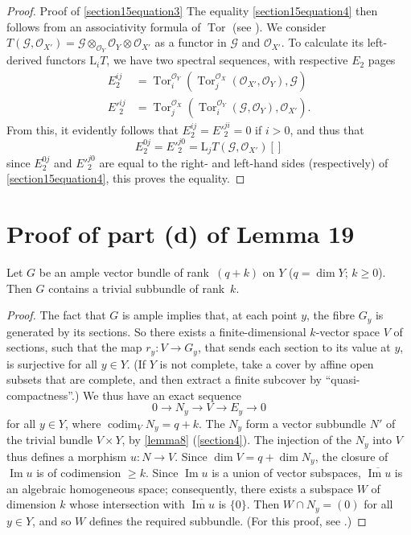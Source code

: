 \documentclass{article}
\theoremstyle{plain}
\newenvironment{lemma}[1]
    {\renewcommand\theinnercustomlemma{#1}\innercustomlemma}
    {\endinnercustomlemma}
\theoremstyle{definition}
\newcommand{\sh}[1]{{\mathscr{#1}}}
\newcommand{\LL}{\mathrm{L}}
\renewcommand{\geq}{\geqslant}
\DeclareMathOperator{\Tor}{Tor}
\DeclareMathOperator{\codim}{codim}
\newcommand{\oldpage}[1]{\marginpar{\footnotesize$\Big\vert$ \textit{p.~#1}}}
\begin{document}
\begin{proof}{Proof of \cref{section15equation3}}
  The equality \cref{section15equation4} then follows from an associativity formula of $\Tor$ (see \cite[p.~345]{3}).
  We consider $T(\sh{G},\sh{O}_{X'}) = \sh{G}\otimes_{\sh{O}_Y}\sh{O}_Y\otimes\sh{O}_{X'}$ as a functor in $\sh{G}$ and $\sh{O}_{X'}$.
  To calculate its left-derived functors $\LL_iT$, we have two spectral sequences, with respective $E_2$ pages
  \begin{align*}
    E_2^{ij} &= \Tor_i^{\sh{O}_Y}(\Tor_j^{\sh{O}_X}(\sh{O}_{X'},\sh{O}_Y),\sh{G})
  \\E'^{ij}_2 &= \Tor_j^{\sh{O}_X}(\Tor_i^{\sh{O}_Y}(\sh{G},\sh{O}_Y),\sh{O}_{X'}).
  \end{align*}
  From this, it evidently follows that $E_2^{ij}=E'^{ji}_2=0$ if $i>0$, and thus that
  \[
    E_2^{0j} = E'^{j0}_2 = \LL_jT(\sh{G},\sh{O}_{X'})[]
  \]
  since $E_2^{0j}$ and $E'^{j0}_2$ are equal to the right- and left-hand sides (respectively) of \cref{section15equation4}, this proves the equality.
\end{proof}


\section{Proof of part (d) of Lemma 19}
\label{section16}

\begin{lemma}{20}
\label{lemma20}
  Let $G$ be an ample vector bundle of rank~$(q+k)$ on $Y$ ($q=\dim Y$; $k\geq0$).
  Then $G$ contains a trivial subbundle of rank~$k$.
\end{lemma}

\begin{proof}
  The fact that $G$ is ample implies that, at each point $y$, the fibre $G_y$ is generated by its sections.
  So there exists a finite-dimensional $k$-vector space $V$ of sections, such that the map $r_y\colon V\to G_y$, that sends each section to its value at $y$, is surjective for all $y\in Y$.
  (If $Y$ is not complete, take a cover by affine open subsets that are complete, and then extract a finite subcover by ``quasi-compactness''.)
  We thus have an exact sequence
  \[
    0 \to N_y \to V \to E_y \to 0
  \]
\oldpage{133}
  for all $y\in Y$, where $\codim_V N_y=q+k$.
  The $N_y$ form a vector subbundle $N'$ of the trivial bundle $V\times Y$, by \cref{lemma8} (\cref{section4}).
  The injection of the $N_y$ into $V$ thus defines a morphism $u\colon N\to V$.
  Since $\dim V=q+\dim N_y$, the closure of $\operatorname{Im}u$ is of codimension $\geq k$.
  Since $\operatorname{Im}u$ is a union of vector subspaces, $\overline{\operatorname{Im}u}$ is an algebraic homogeneous space;
  consequently, there exists a subspace $W$ of dimension $k$ whose intersection with $\overline{\operatorname{Im}u}$ is $\{0\}$.
  Then $W\cap N_y=(0)$ for all $y\in Y$, and so $W$ defines the required subbundle.
  (For this proof, see \cite{1}.)
\end{proof}
\end{document}
